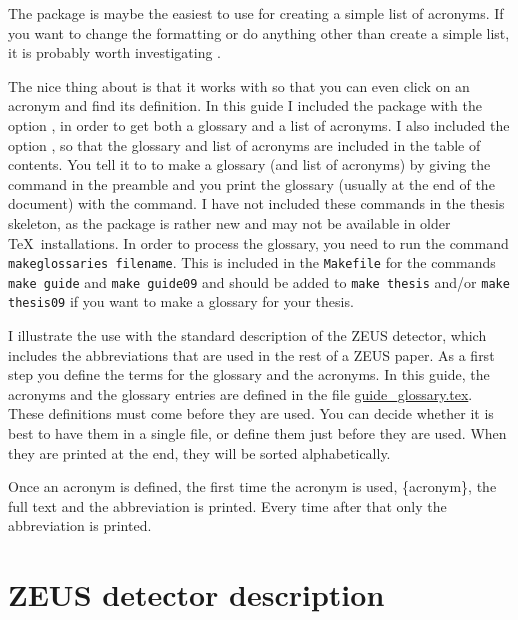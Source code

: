 The  package is maybe the easiest to use for creating
a simple list of acronyms. If you want to change the formatting or do
anything other than create a simple list, it is probably worth
investigating .

The nice thing about  is that it works with
 so that you can even click on an acronym and find
its definition. In this guide I included the package with the option
, in order to get both a glossary and a list of
acronyms. I also included the option , so that the
glossary and list of acronyms are included in the table of
contents. You tell it to to make a glossary (and list of acronyms) by
giving the command  in the preamble and you
print the glossary (usually at the end of the document) with the
 command. I have not included these commands in
the thesis skeleton, as the  package is rather new
and may not be available in older \TeX\ installations. In order to
process the glossary, you need to run the command
\texttt{makeglossaries filename}. This is included in the
\texttt{Makefile} for the commands \texttt{make guide} and
\texttt{make guide09} and should be added to \texttt{make thesis}
and/or \texttt{make thesis09} if you want to make a glossary for your
thesis.

I illustrate the use with the standard description of the ZEUS
detector, which includes the abbreviations that are used in the rest
of a ZEUS paper.  As a first step you define the terms for the
glossary and the acronyms.  In this guide, the acronyms and the
glossary entries are defined in the file
\url{guide_glossary.tex}. These definitions must come before
they are used. You can decide whether it is best to have them in a
single file, or define them just before they are used. When they are
printed at the end, they will be sorted alphabetically.

Once an acronym is defined, the first time the acronym is used,
\{acronym\}, the full text and the abbreviation is
printed. Every time after that only the abbreviation is printed.

\section{ZEUS detector description}
\label{sec:app:glossary:zeus}

